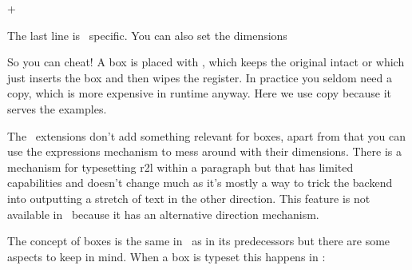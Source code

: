 \starttyping
\scratchwidth \wd\scratchbox
\scratchheight\ht\scratchbox
\scratchdepth \dp\scratchbox
\scratchtotal \dimexpr\ht\scratchbox+\dp\scratchbox\relax
\scratchtotal \htdp\scratchbox
\stoptyping

The last line is \CONTEXT\ specific. You can also set the dimensions

\starttyping
\wd\scratchbox 10cm
\ht\scratchbox 10mm
\dp\scratchbox  5mm
\stoptyping

So you can cheat! A box is placed with \type {\copy}, which keeps the original
intact or \type {\box} which just inserts the box and then wipes the register. In
practice you seldom need a copy, which is more expensive in runtime anyway. Here
we use copy because it serves the examples.

\starttyping
\copy\scratchbox
\box \scratchbox
\stoptyping

\stopsection

\startsection[title={\ETEX\ primitives}]

The \ETEX\ extensions don't add something relevant for boxes, apart from that you
can use the expressions mechanism to mess around with their dimensions. There is
a mechanism for typesetting r2l within a paragraph but that has limited
capabilities and doesn't change much as it's mostly a way to trick the backend
into outputting a stretch of text in the other direction. This feature is not
available in \LUATEX\ because it has an alternative direction mechanism.

\stopsection

\startsection[title={\LUATEX\ primitives}]

The concept of boxes is the same in \LUATEX\ as in its predecessors but there are
some aspects to keep in mind. When a box is typeset this happens in \LUATEX:

